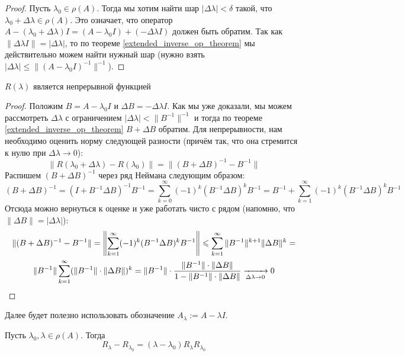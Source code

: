 \begin{proof}
	Пусть $\lambda_0 \in \rho(A)$. Тогда мы хотим найти шар $|\Delta \lambda| < \delta$ такой, что $\lambda_0 + \Delta \lambda \in \rho(A)$. Это означает, что оператор $A - (\lambda_0 + \Delta \lambda)I = (A - \lambda_0 I) + (-\Delta \lambda I)$ должен быть обратим. Так как $\|\Delta \lambda I\| = |\Delta \lambda|$, то по теореме \ref{extended_inverse_op_theorem} мы действительно можем найти нужный шар (нужно взять $|\Delta \lambda| \le \|(A - \lambda_0 I)^{-1}\|^{-1}$).
\end{proof}

\begin{proposition}
	$R(\lambda)$ является непрерывной функцией
\end{proposition}

\begin{proof}
	Положим $B = A - \lambda_0 I$ и $\Delta B = -\Delta \lambda I$. Как мы уже доказали, мы можем рассмотреть $\Delta \lambda$ с ограничением $|\Delta \lambda| < \|B^{-1}\|^{-1}$ и тогда по теореме \ref{extended_inverse_op_theorem} $B + \Delta B$ обратим. Для непрерывности, нам необходимо оценить норму следующей разности (причём так, что она стремится к нулю при $\Delta \lambda \to 0$):
	\[
		\|R(\lambda_0 + \Delta \lambda) - R(\lambda_0)\| = \|(B + \Delta B)^{-1} - B^{-1}\|
	\]
	Распишем $(B + \Delta B)^{-1}$ через ряд Неймана следующим образом:
	\[
		(B + \Delta B)^{-1} = (I + B^{-1}\Delta B)^{-1}B^{-1} = \sum_{k = 0}^\infty (-1)^k (B^{-1}\Delta B)^k B^{-1} = B^{-1} + \sum_{k = 1}^\infty (-1)^k (B^{-1}\Delta B)^kB^{-1}
	\]
	Отсюда можно вернуться к оценке и уже работать чисто с рядом (напомню, что $\|\Delta B\| = |\Delta \lambda|$):
	\begin{multline*}
		\|(B + \Delta B)^{-1} - B^{-1}\| = \left\|\sum_{k = 1}^\infty (-1)^k(B^{-1}\Delta B)^kB^{-1}\right\| \leqslant \sum_{k = 1}^\infty \|B^{-1}\|^{k + 1}\|\Delta B\|^k =
		\\
		\|B^{-1}\|\sum_{k = 1}^\infty (\|B^{-1}\| \cdot \|\Delta B\|)^k = \|B^{-1}\| \cdot \frac{\|B^{-1}\| \cdot \|\Delta B\|}{1 - \|B^{-1}\| \cdot \|\Delta B\|} \xrightarrow[\Delta \lambda \to 0]{} 0
	\end{multline*}
\end{proof}

\begin{note}
	Далее будет полезно использовать обозначение $A_\lambda := A - \lambda I$.
\end{note}

\begin{proposition}
	Пусть $\lambda_0, \lambda \in \rho(A)$. Тогда
	\[
		R_\lambda - R_{\lambda_0} = (\lambda - \lambda_0)R_\lambda R_{\lambda_0}
	\]
\end{proposition}

